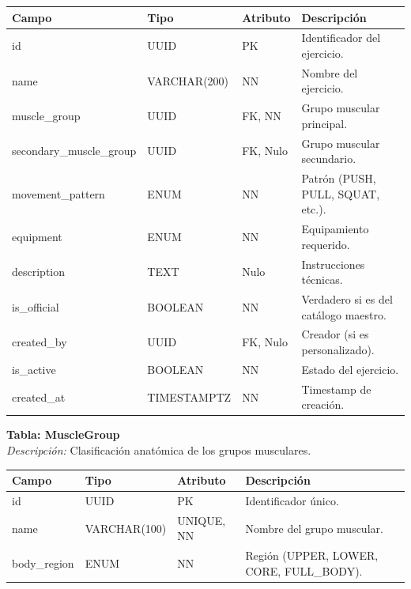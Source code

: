 \documentclass[12pt]{article}
\begin{document}
\begin{table}[h!]
    \centering
    \renewcommand{\arraystretch}{1.2}
    \small
    \begin{tabular}{|p{3.8cm}|p{2.7cm}|p{1.9cm}|p{6.3cm}|}
        \hline
        \rowcolor[HTML]{EFEFEF}
        \textbf{Campo} & \textbf{Tipo} & \textbf{Atributo} & \textbf{Descripción} \\ \hline
        id & UUID & PK & Identificador del ejercicio. \\ \hline
        name & VARCHAR(200) & NN & Nombre del ejercicio. \\ \hline
        muscle\_group & UUID & FK, NN & Grupo muscular principal. \\ \hline
        secondary\_muscle\_group & UUID & FK, Nulo & Grupo muscular secundario. \\ \hline
        movement\_pattern & ENUM & NN & Patrón (PUSH, PULL, SQUAT, etc.). \\ \hline
        equipment & ENUM & NN & Equipamiento requerido. \\ \hline
        description & TEXT & Nulo & Instrucciones técnicas. \\ \hline
        is\_official & BOOLEAN & NN & Verdadero si es del catálogo maestro. \\ \hline
        created\_by & UUID & FK, Nulo & Creador (si es personalizado). \\ \hline
        is\_active & BOOLEAN & NN & Estado del ejercicio. \\ \hline
        created\_at & TIMESTAMPTZ & NN & Timestamp de creación. \\ \hline
    \end{tabular}
\end{table}
\newpage
\noindent\textbf{Tabla: MuscleGroup} \\
\textit{Descripción:} Clasificación anatómica de los grupos musculares.
\begin{table}[h!]
    \centering
    \renewcommand{\arraystretch}{1.2}
    \small
    \begin{tabular}{|p{3.5cm}|p{2.7cm}|p{2cm}|p{6.5cm}|}
        \hline
        \rowcolor[HTML]{EFEFEF}
        \textbf{Campo} & \textbf{Tipo} & \textbf{Atributo} & \textbf{Descripción} \\ \hline
        id & UUID & PK & Identificador único. \\ \hline
        name & VARCHAR(100) & UNIQUE, NN & Nombre del grupo muscular. \\ \hline
        body\_region & ENUM & NN & Región (UPPER, LOWER, CORE, FULL\_BODY). \\ \hline
    \end{tabular}
\end{table}
\end{document}
